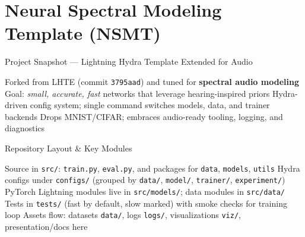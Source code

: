 \section[toc={Neural Spectral Modeling}]{Neural Spectral Modeling Template (NSMT)}
  
\begin{emptyslide}[toc={}]{}
\vspace{-1.44em}
\end{emptyslide}

\begin{slide}[\slideopts,toc={Snapshot}]{Project Snapshot — Lightning Hydra Template Extended for Audio}
  \vspace{-0.75em}
  \begin{itemize}
    \mpitem Forked from LHTE (commit \texttt{3795aad}) and tuned for \textbf{spectral audio modeling}
    \mpitem Goal: \emph{small, accurate, fast} networks that leverage hearing-inspired priors
    \mpitem Hydra-driven config system; single command switches models, data, and trainer backends
    \mpitem Drops MNIST/CIFAR; embraces audio-ready tooling, logging, and diagnostics
  \end{itemize}
\end{slide}

\begin{slide}[\slideopts,toc={Layout}]{Repository Layout & Key Modules}
  \vspace{-0.75em}
  \begin{itemize}
    \mpitem Source in \texttt{src/}: \texttt{train.py}, \texttt{eval.py}, and packages for \texttt{data}, \texttt{models}, \texttt{utils}
    \mpitem Hydra configs under \texttt{configs/} (grouped by \texttt{data/}, \texttt{model/}, \texttt{trainer/}, \texttt{experiment/})
    \mpitem PyTorch Lightning modules live in \texttt{src/models/}; data modules in \texttt{src/data/}
    \mpitem Tests in \texttt{tests/} (fast by default, slow marked) with smoke checks for training loop
    \mpitem Assets flow: datasets \texttt{data/}, logs \texttt{logs/}, visualizations \texttt{viz/}, presentation/docs here
  \end{itemize}
\end{slide}

